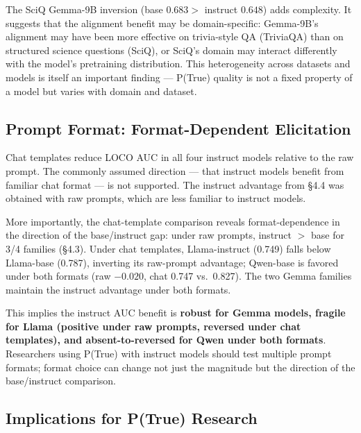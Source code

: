 \documentclass[11pt]{article}
\begin{document}
The SciQ Gemma-9B inversion (base $0.683 >$ instruct $0.648$) adds complexity. It suggests that the alignment benefit may be domain-specific: Gemma-9B's alignment may have been more effective on trivia-style QA (TriviaQA) than on structured science questions (SciQ), or SciQ's domain may interact differently with the model's pretraining distribution. This heterogeneity across datasets and models is itself an important finding --- P(True) quality is not a fixed property of a model but varies with domain and dataset.

\subsection{Prompt Format: Format-Dependent Elicitation}

Chat templates reduce LOCO AUC in all four instruct models relative to the raw prompt. The commonly assumed direction --- that instruct models benefit from familiar chat format --- is not supported. The instruct advantage from \S4.4 was obtained with raw prompts, which are less familiar to instruct models.

More importantly, the chat-template comparison reveals format-dependence in the direction of the base/instruct gap: under raw prompts, instruct $>$ base for 3/4 families (\S4.3). Under chat templates, Llama-instruct (0.749) falls below Llama-base (0.787), inverting its raw-prompt advantage; Qwen-base is favored under both formats (raw $-0.020$, chat 0.747 vs.\ 0.827). The two Gemma families maintain the instruct advantage under both formats.

This implies the instruct AUC benefit is \textbf{robust for Gemma models, fragile for Llama (positive under raw prompts, reversed under chat templates), and absent-to-reversed for Qwen under both formats}. Researchers using P(True) with instruct models should test multiple prompt formats; format choice can change not just the magnitude but the direction of the base/instruct comparison.

\subsection{Implications for P(True) Research}
\end{document}
